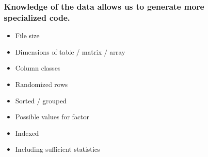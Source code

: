 \documentclass{beamer}
\begin{document}
\begin{frame}

    \frametitle{Knowledge of the data allows us to generate more
    specialized code.}


    \begin{itemize}

	\item File size
	\item Dimensions of table / matrix / array
	\item Column classes
	\item Randomized rows
	\item Sorted / grouped
	\item Possible values for factor
	\item Indexed
	\item Including sufficient statistics

    \end{itemize}

\end{frame}
\end{document}

